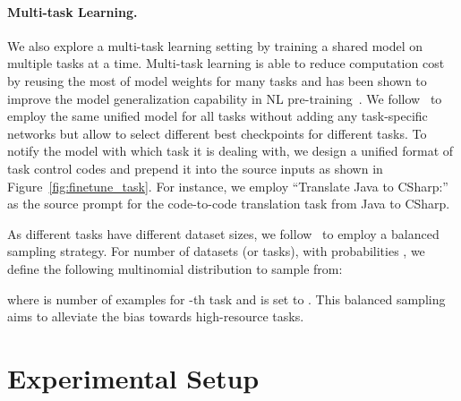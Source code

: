 \documentclass[11pt]{article}
\begin{document}
\paragraph{Multi-task Learning.}
We also explore a multi-task learning setting by training a shared model on multiple tasks at a time. 
Multi-task learning is able to reduce computation cost by reusing the most of model weights for many tasks and has been shown to improve the model generalization capability in NL pre-training~\cite{DBLP:conf/acl/LiuHCG19}.
We follow~\citet{DBLP:journals/jmlr/RaffelSRLNMZLL20} to employ the same unified model for all tasks without adding any task-specific networks but allow to select different best checkpoints for different tasks. 
To notify the model with which task it is dealing with, we design a unified format of task control codes and prepend it into the source inputs as shown in Figure~\ref{fig:finetune_task}. For instance, we employ ``Translate Java to CSharp:'' as the source prompt for the code-to-code translation task from Java to CSharp. 



As different tasks have different dataset sizes, we follow~\citet{DBLP:conf/nips/ConneauL19} to employ a balanced sampling strategy. For  number of datasets (or tasks), with probabilities , we define the following multinomial distribution to sample from:

\noindent where  is number of examples for -th task and  is set to . This balanced sampling aims to alleviate the bias towards high-resource tasks. \section{Experimental Setup}
\begin{table}[!t]
\centering
{}
\vspace{-0.5em}
\caption{Dataset statistics.   ``Identifier'' denotes the proportion of identifiers over all code tokens for each PL. \label{table:data}
}
\vspace{-2em}
\end{table}
\end{document}

